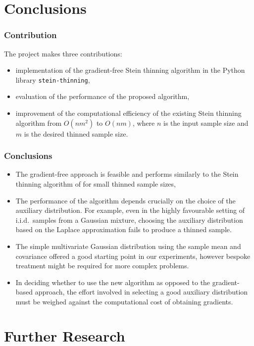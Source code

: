 \documentclass{beamer}
\begin{document}
\section{Conclusions}

\begin{frame}
\frametitle{Contribution}

The project makes three contributions:
\begin{itemize}
\item implementation of the gradient-free Stein thinning algorithm in the Python library \texttt{stein-thinning},
\item evaluation of the performance of the proposed algorithm,
\item improvement of the computational efficiency of the existing Stein thinning algorithm from $O(nm^2)$ to $O(nm)$, where $n$ is the input sample size and $m$ is the desired thinned sample size.
\end{itemize}

\end{frame}

\begin{frame}
\frametitle{Conclusions}

\begin{itemize}
\item The gradient-free approach is feasible and performs similarly to the Stein thinning algorithm of \cite{riabizOptimalThinningMCMC2022} for small thinned sample sizes,
\item The performance of the algorithm depends crucially on the choice of the auxiliary distribution. For example, even in the highly favourable setting of i.i.d.\ samples from a Gaussian mixture, choosing the auxiliary distribution based on the Laplace approximation fails to produce a thinned sample.
\item The simple multivariate Gaussian distribution using the sample mean and covariance offered a good starting point in our experiments, however bespoke treatment might be required for more complex problems.
\item In deciding whether to use the new algorithm as opposed to the gradient-based approach, the effort involved in selecting a good auxiliary distribution must be weighed against the computational cost of obtaining gradients.
\end{itemize}

\end{frame}

\section{Further Research}
\end{document}
